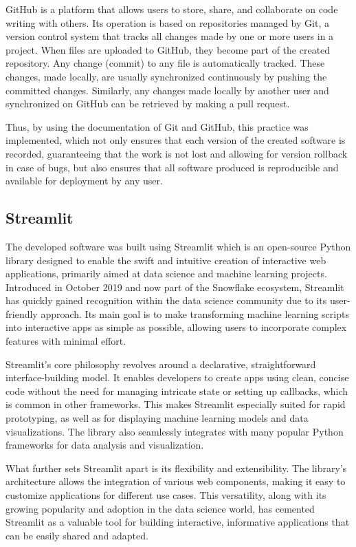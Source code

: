 GitHub is a platform that allows users to store, share, and collaborate on code writing with others. \cite{github} Its operation is based on repositories managed by Git, a version control system that tracks all changes made by one or more users in a project. \cite{github} When files are uploaded to GitHub, they become part of the created repository. Any change (commit) to any file is automatically tracked. These changes, made locally, are usually synchronized continuously by pushing the committed changes. Similarly, any changes made locally by another user and synchronized on GitHub can be retrieved by making a pull request. \cite{github}

Thus, by using the documentation of Git and GitHub, this practice was implemented, which not only ensures that each version of the created software is recorded, guaranteeing that the work is not lost and allowing for version rollback in case of bugs, but also ensures that all software produced is reproducible and available for deployment by any user. \cite{github}

\subsection{Streamlit}

The developed software was built using Streamlit which is an open-source Python library designed to enable the swift and intuitive creation of interactive web applications, primarily aimed at data science and machine learning projects. Introduced in October 2019 and now part of the Snowflake ecosystem, Streamlit has quickly gained recognition within the data science community due to its user-friendly approach. Its main goal is to make transforming machine learning scripts into interactive apps as simple as possible, allowing users to incorporate complex features with minimal effort. \cite{Sehm2022}

Streamlit's core philosophy revolves around a declarative, straightforward interface-building model. It enables developers to create apps using clean, concise code without the need for managing intricate state or setting up callbacks, which is common in other frameworks. This makes Streamlit especially suited for rapid prototyping, as well as for displaying machine learning models and data visualizations. The library also seamlessly integrates with many popular Python frameworks for data analysis and visualization. \cite{Sehm2022}

What further sets Streamlit apart is its flexibility and extensibility. The library's architecture allows the integration of various web components, making it easy to customize applications for different use cases. This versatility, along with its growing popularity and adoption in the data science world, has cemented Streamlit as a valuable tool for building interactive, informative applications that can be easily shared and adapted. \cite{Dayanithi2023}


